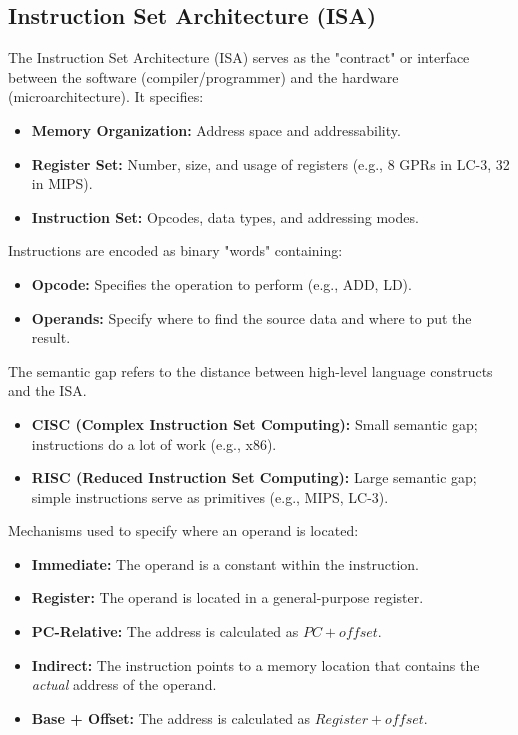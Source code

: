 \subsection{Instruction Set Architecture (ISA)}

\begin{definition}
The Instruction Set Architecture (ISA) serves as the "contract" or interface between the software (compiler/programmer) and the hardware (microarchitecture). It specifies:
\begin{itemize}
    \item \textbf{Memory Organization:} Address space and addressability.
    \item \textbf{Register Set:} Number, size, and usage of registers (e.g., 8 GPRs in LC-3, 32 in MIPS).
    \item \textbf{Instruction Set:} Opcodes, data types, and addressing modes.
\end{itemize}
\end{definition}

\begin{important}
Instructions are encoded as binary "words" containing:
\begin{itemize}
    \item \textbf{Opcode:} Specifies the operation to perform (e.g., ADD, LD).
    \item \textbf{Operands:} Specify where to find the source data and where to put the result.
\end{itemize}
\end{important}

\begin{lemma}
The semantic gap refers to the distance between high-level language constructs and the ISA. 
\begin{itemize}
    \item \textbf{CISC (Complex Instruction Set Computing):} Small semantic gap; instructions do a lot of work (e.g., x86).
    \item \textbf{RISC (Reduced Instruction Set Computing):} Large semantic gap; simple instructions serve as primitives (e.g., MIPS, LC-3).
\end{itemize}
\end{lemma}

\begin{definition}
Mechanisms used to specify where an operand is located:
\begin{itemize}
    \item \textbf{Immediate:} The operand is a constant within the instruction.
    \item \textbf{Register:} The operand is located in a general-purpose register.
    \item \textbf{PC-Relative:} The address is calculated as $PC + offset$.
    \item \textbf{Indirect:} The instruction points to a memory location that contains the \textit{actual} address of the operand.
    \item \textbf{Base + Offset:} The address is calculated as $Register + offset$.
\end{itemize}
\end{definition}

